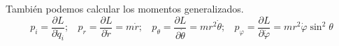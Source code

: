 También podemos calcular los momentos generalizados.
\[p_i = \frac{\partial L}{\partial \dot{q}_i}; \ \ \ \ p_r = \frac{\partial L}{\partial \dot{r}}=m\dot{r}; \ \ \ \ p_{\theta} = \frac{\partial L}{\partial \dot{\theta}}=mr^2\dot{\theta}; \ \ \ \ p_{\varphi} = \frac{\partial L}{\partial \dot{\varphi}}=mr^2\dot{\varphi} \sin^2{\theta}\]
